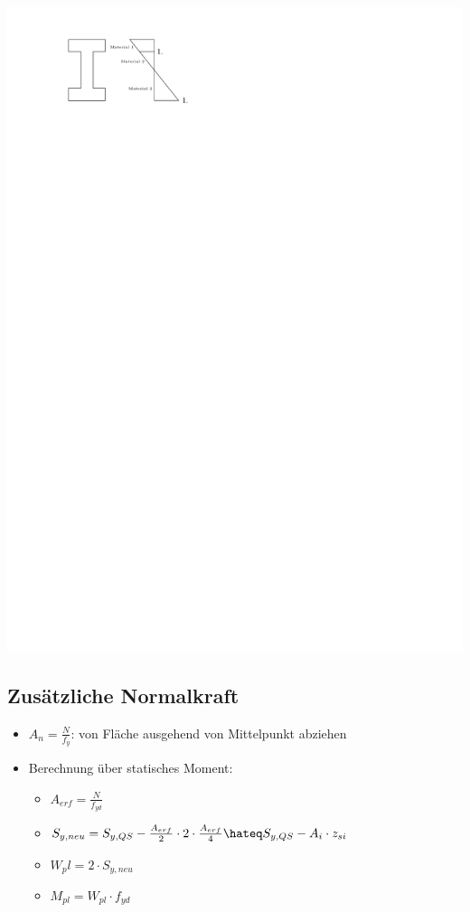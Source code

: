 \documentclass[fleqn,twoside]{article}
\begin{document}
    \begin{minipage}{0.20\textwidth}
        \includegraphics[scale = 0.7]{Grafiken/QS-Werte heterogen.pdf}
    \end{minipage}

    \subsection{Zusätzliche Normalkraft}
        \begin{itemize}
            \item $A_n = \frac{N}{f_y}$: von Fläche ausgehend von Mittelpunkt abziehen
            \item Berechnung über statisches Moment:
                \begin{itemize}
                    \item $A_{erf} = \frac{N}{f_{yd}}$
                    \item $S_{y,neu} = S_{y,QS} - \frac{A_{erf}}{2} \cdot 2 \cdot \frac{A_{erf}}{4} \hateq S_{y,QS} - A_i \cdot z_{si} $ 
                    \item $W_pl = 2 \cdot S_{y,neu}$
                    \item $M_{pl} = W_{pl} \cdot f_{yd}$
                \end{itemize}
        \end{itemize}
\end{document}
